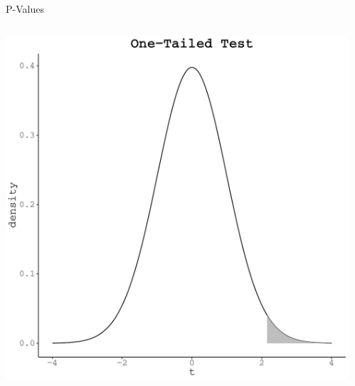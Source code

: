 \documentclass[10pt]{beamer}\usepackage[]{graphicx}\usepackage[]{color}
\makeatletter
\def\maxwidth{ %
  \ifdim\Gin@nat@width>\linewidth
    \linewidth
  \else
    \Gin@nat@width
  \fi
}
\newenvironment{knitrout}{}{} %
\makeatother
\begin{document}
\begin{frame}[fragile]{P-Values}

  \begin{columns}
    \begin{column}{0.5\textwidth}

\begin{knitrout}\footnotesize
{}\color{fgcolor}

{\centering \includegraphics[width=\maxwidth]{figure/unnamed-chunk-13-1} 

}


\end{knitrout}

    \end{column}
    \begin{column}{0.5\textwidth}
     
\begin{knitrout}\footnotesize
{}\color{fgcolor}


\end{knitrout}
\end{column}
\end{columns}
\end{frame}
\end{document}
